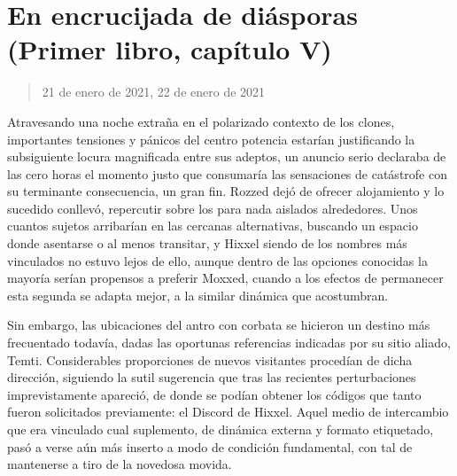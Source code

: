 \documentclass[
]{book}
\begin{document}
\hypertarget{en-encrucijada-de-diuxe1sporas-primer-libro-capuxedtulo-v}{%
\section{En encrucijada de diásporas (Primer libro, capítulo V)}\label{en-encrucijada-de-diuxe1sporas-primer-libro-capuxedtulo-v}}

\begin{quote}
21 de enero de 2021, 22 de enero de 2021
\end{quote}

Atravesando una noche extraña en el polarizado contexto de los clones, importantes tensiones y pánicos del centro potencia estarían justificando la subsiguiente locura magnificada entre sus adeptos, un anuncio serio declaraba de las cero horas el momento justo que consumaría las sensaciones de catástrofe con su terminante consecuencia, un gran fin. Rozzed dejó de ofrecer alojamiento y lo sucedido conllevó, repercutir sobre los para nada aislados alrededores. Unos cuantos sujetos arribarían en las cercanas alternativas, buscando un espacio donde asentarse o al menos transitar, y Hixxel siendo de los nombres más vinculados no estuvo lejos de ello, aunque dentro de las opciones conocidas la mayoría serían propensos a preferir Moxxed, cuando a los efectos de permanecer esta segunda se adapta mejor, a la similar dinámica que acostumbran.

Sin embargo, las ubicaciones del antro con corbata se hicieron un destino más frecuentado todavía, dadas las oportunas referencias indicadas por su sitio aliado, Temti. Considerables proporciones de nuevos visitantes procedían de dicha dirección, siguiendo la sutil sugerencia que tras las recientes perturbaciones imprevistamente apareció, de donde se podían obtener los códigos que tanto fueron solicitados previamente: el Discord de Hixxel. Aquel medio de intercambio que era vinculado cual suplemento, de dinámica externa y formato etiquetado, pasó a verse aún más inserto a modo de condición fundamental, con tal de mantenerse a tiro de la novedosa movida.
\end{document}
